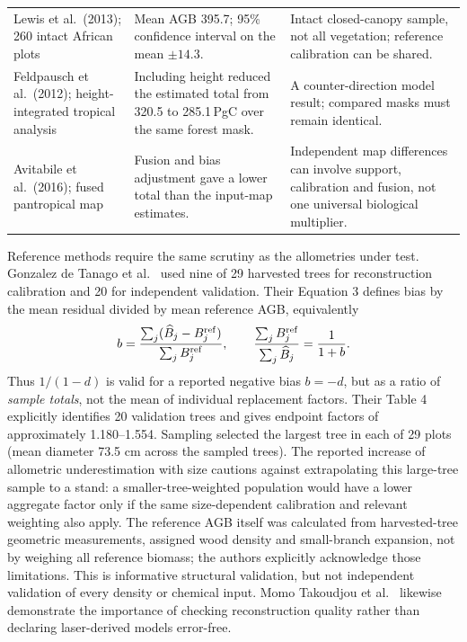 \documentclass[11pt,a4paper]{article}
\theoremstyle{remark}
\begin{document}
\begin{table}[p]
\begin{tabularx}{\textwidth}{@{}p{}p{}Y@{}}
Lewis et al.\ (2013); 260 intact African plots & Mean AGB 395.7; 95\% confidence interval on the mean $\pm14.3$. & Intact closed-canopy sample, not all vegetation; reference calibration can be shared.\\[.6em]
Feldpausch et al.\ (2012); height-integrated tropical analysis & Including height reduced the estimated total from 320.5 to 285.1\,PgC over the same forest mask. & A counter-direction model result; compared masks must remain identical.\\[.6em]
Avitabile et al.\ (2016); fused pantropical map & Fusion and bias adjustment gave a lower total than the input-map estimates. & Independent map differences can involve support, calibration and fusion, not one universal biological multiplier.\\
\bottomrule
\end{tabularx}
\end{table}

Reference methods require the same scrutiny as the allometries under test. Gonzalez de Tanago et al.\ \citep{Gonzalez2018} used nine of 29 harvested trees for reconstruction calibration and 20 for independent validation. Their Equation 3 defines bias by the mean residual divided by mean reference AGB, equivalently
\begin{equation}
 b=\frac{\sum_j(\widehat B_j-B_j^{\rm ref})}{\sum_j B_j^{\rm ref}},
 \qquad \frac{\sum_j B_j^{\rm ref}}{\sum_j\widehat B_j}=\frac{1}{1+b}.
 \label{eq:referencebias}
\end{equation}
Thus $1/(1-d)$ is valid for a reported negative bias $b=-d$, but as a ratio of \emph{sample totals}, not the mean of individual replacement factors. Their Table 4 explicitly identifies 20 validation trees and gives endpoint factors of approximately 1.180--1.554. Sampling selected the largest tree in each of 29 plots (mean diameter 73.5 cm across the sampled trees). The reported increase of allometric underestimation with size cautions against extrapolating this large-tree sample to a stand: a smaller-tree-weighted population would have a lower aggregate factor only if the same size-dependent calibration and relevant weighting also apply. The reference AGB itself was calculated from harvested-tree geometric measurements, assigned wood density and small-branch expansion, not by weighing all reference biomass; the authors explicitly acknowledge those limitations. This is informative structural validation, but not independent validation of every density or chemical input. Momo Takoudjou et al.\ \citep{Momo2018} likewise demonstrate the importance of checking reconstruction quality rather than declaring laser-derived models error-free.
\end{document}
